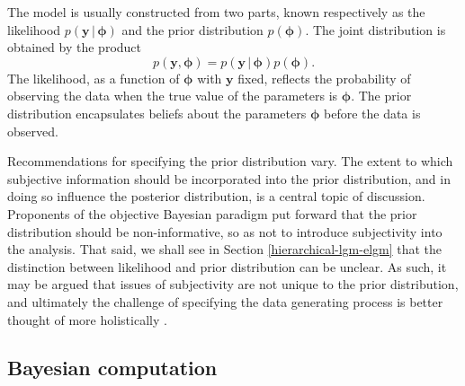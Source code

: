 \documentclass[a4paper, nobind]{templates/ociamthesis}
\begin{document}
The model is usually constructed from two parts, known respectively as the likelihood \(p(\mathbf{y} \, | \, \boldsymbol{\mathbf{\phi}})\) and the prior distribution \(p(\boldsymbol{\mathbf{\phi}})\).
The joint distribution is obtained by the product
\begin{equation}
p(\mathbf{y}, \boldsymbol{\mathbf{\phi}}) = p(\mathbf{y} \, | \, \boldsymbol{\mathbf{\phi}}) p(\boldsymbol{\mathbf{\phi}}).
\end{equation}
The likelihood, as a function of \(\boldsymbol{\mathbf{\phi}}\) with \(\mathbf{y}\) fixed, reflects the probability of observing the data when the true value of the parameters is \(\boldsymbol{\mathbf{\phi}}\).
The prior distribution encapsulates beliefs about the parameters \(\boldsymbol{\mathbf{\phi}}\) before the data is observed.

Recommendations for specifying the prior distribution vary.
The extent to which subjective information should be incorporated into the prior distribution, and in doing so influence the posterior distribution, is a central topic of discussion.
Proponents of the objective Bayesian paradigm \autocite{berger2006case} put forward that the prior distribution should be non-informative, so as not to introduce subjectivity into the analysis.
That said, we shall see in Section \ref{hierarchical-lgm-elgm} that the distinction between likelihood and prior distribution can be unclear.
As such, it may be argued that issues of subjectivity are not unique to the prior distribution, and ultimately the challenge of specifying the data generating process is better thought of more holistically \autocite{gelman2017prior}.

\hypertarget{bayesian-computation}{%
\subsection{Bayesian computation}\label{bayesian-computation}}
\end{document}
